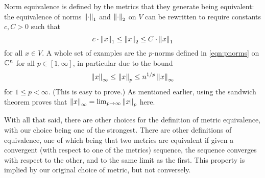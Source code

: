 Norm equivalence is defined by the metrics that they generate being equivalent: the equivalence of norms $\left\lVert \cdot \right\rVert_{1}$ and $\left\lVert \cdot \right\rVert_{2}$ on $V$ can be rewritten to require constants $c,C>0$ such that \[ c\cdot \left\lVert x \right\rVert_{1} \leq \left\lVert x \right\rVert_{2} \leq C \cdot \left\lVert x \right\rVert_{1} \] for all $x\in V$. A whole set of examples are the $p$-norms defined in \eqref{eqn:pnorms} on $\mathbb{C}^{n}$ for all $p\in [1,\infty]$, in particular due to the bound \[ \left\lVert x \right\rVert_{\infty} \leq \left\lVert x \right\rVert_{p} \leq n^{1/p} \left\lVert x \right\rVert_{\infty} \] for $1\leq p < \infty$. (This is easy to prove.) As mentioned earlier, using the sandwich theorem proves that $\left\lVert x \right\rVert_{\infty} = \lim_{p\to\infty}\left\lVert x \right\rVert_{p}$ here.

With all that said, there are other choices for the definition of metric equivalence, with our choice being one of the strongest. There are other definitions of equivalence, one of which being that two metrics are equivalent if given a convergent (with respect to one of the metrics) sequence, the sequence converges with respect to the other, and to the same limit as the first. This property is implied by our original choice of metric, but not conversely.